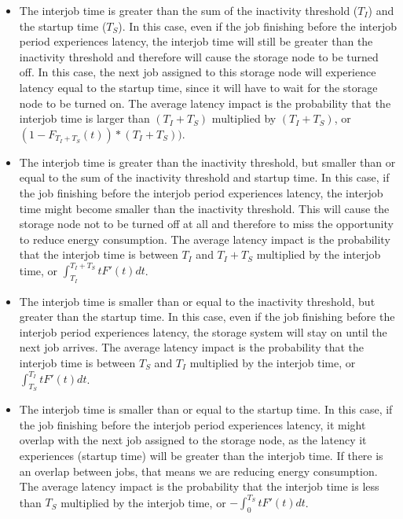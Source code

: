\documentclass[preprint,12pt]{elsarticle}
\begin{document}
\begin{itemize}
\item The interjob time
is greater than the sum of the inactivity threshold ($T_I$) and the
startup time ($T_S$).
In this case, even if the job finishing before the interjob period experiences
latency, the interjob time will still be greater than the inactivity threshold and
therefore will cause the storage node to be turned off. In this case,
the next job
assigned to this storage node will experience latency equal to the startup
time, since it will have to wait for the storage node to be turned
on. The average latency impact is the probability that the interjob time
is larger than $(T_I+T_S)$ multiplied by $(T_I+T_S)$, or
$(1-F_{T_I+T_S}(t))*(T_I+T_S))$.

\item The interjob time
is greater than the inactivity threshold, but smaller than or equal to the sum of
the inactivity threshold and startup time. In this case, if the job finishing
before the interjob period experiences latency, the interjob time might become smaller
than the inactivity threshold. This will cause the storage node not to be turned
off at all and therefore to miss the opportunity to reduce energy consumption.
The average latency impact is the probability that the interjob time
is between $T_I$ and $T_I+T_S$ multiplied by
the interjob time, or $\int_{T_I}^{T_I+T_S}tF'(t)dt$.

\item The interjob time is
smaller than or equal to the inactivity threshold, but greater than the startup time. In this
case, even if the job finishing before the interjob period experiences latency,
the storage system will stay on until the next job arrives.
The average latency impact is the probability that the interjob time
is between $T_S$ and $T_I$ multiplied by
the interjob time, or $\int_{T_S}^{T_I}tF'(t)dt$.

\item The interjob time
is smaller than or equal to the startup time. In this case, if the job
finishing before the interjob period experiences latency, it might overlap
with the next job assigned to the storage node, as the latency it experiences
(startup time) will be greater than the interjob time. If there is an overlap
between jobs, that means we are reducing energy consumption.
The average latency impact is the probability that the interjob time
is less than $T_S$ multiplied by
the interjob time, or $-\int_{0}^{T_S}tF'(t)dt$.
\end{itemize}  
\end{document}
